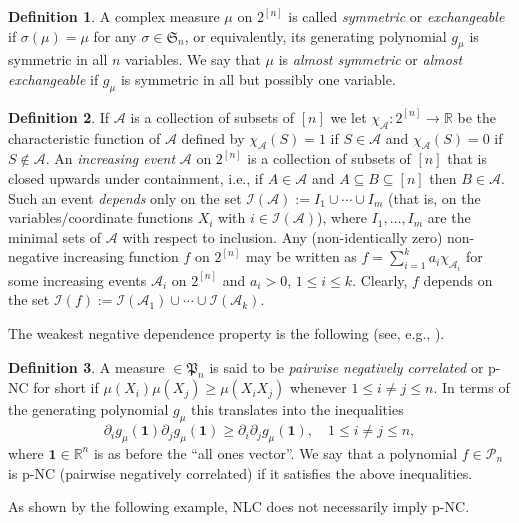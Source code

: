 \documentclass[10pt,reqno]{amsart}
\theoremstyle{plain}
\theoremstyle{definition}
\newtheorem{definition}{Definition}[section]
\theoremstyle{remark}
\newcommand{\PP}{\mathcal{P}}
\newcommand{\cI}{\mathcal{I}}
\newcommand{\cA}{\mathcal{A}}
\newcommand{\RR}{\mathbb{R}}
\newcommand{\ben}{\mathbf{1}}
\newcommand{\fP}{\mathfrak{P}}
\newcommand{\pa}{\partial}
\begin{document}
\begin{definition}\label{d-exc}
A complex measure $\mu$ on $2^{[n]}$ is called {\em symmetric} or
{\em exchangeable} if $\sigma(\mu)=\mu$ for any $\sigma\in \mathfrak{S}_n$,
or equivalently, its generating polynomial $g_\mu$ is symmetric in all $n$
variables. We say that $\mu$ is {\em almost symmetric} or {\em almost
exchangeable} if $g_\mu$ is symmetric in all but possibly one variable. 
\end{definition}

\begin{definition}\label{d-inc-ev}
If $\mathcal{A}$ is a collection of subsets of $[n]$ we let 
$\chi_{\mathcal{A}} : 2^{[n]} \rightarrow \RR$ be the characteristic function 
of $\mathcal{A}$ defined by 
$\chi_{\mathcal{A}}(S) = 1$ if $S \in \mathcal{A}$ and 
$\chi_{\mathcal{A}}(S) = 0$ if $S \notin \mathcal{A}$.
An {\em increasing event} $\mathcal{A}$ on $2^{[n]}$ is a collection of 
subsets of $[n]$ that is closed upwards under containment, i.e., if 
$A \in \mathcal{A}$ and $A \subseteq B \subseteq [n]$ then 
$B \in \mathcal{A}$. Such an event {\em depends} only on the set
$\cI(\cA):=I_1\cup\cdots\cup I_m$ (that is, on the variables/coordinate 
functions $X_i$ with 
$i\in\cI(\cA)$), where $I_1,\ldots,I_m$ are the minimal sets of $\cA$ 
with respect to inclusion. Any (non-identically zero) non-negative increasing
function $f$ on $2^{[n]}$ may be written as $f=\sum_{i=1}^{k}a_i\chi_{\cA_i}$ 
for some increasing events $\cA_i$ on $2^{[n]}$ and $a_i>0$, $1\le i\le k$.
Clearly, $f$ depends on the set $\cI(f):=\cI(\cA_1)\cup\cdots\cup\cI(\cA_k)$.
\end{definition}

The weakest negative dependence property is the following 
(see, e.g., \cite{P}).

\begin{definition}\label{d-pnc}
A measure $\in\fP_n$ is said to be {\em pairwise
negatively correlated} or p-NC for short 
if $\mu(X_i)\mu(X_j)\ge \mu(X_iX_j)$ whenever 
$1\le i\neq j\le n$. In terms of the generating polynomial $g_\mu$ this 
translates into the inequalities
$$\pa_i g_\mu(\ben)\pa_j g_\mu(\ben)\ge \pa_i \pa_j g_\mu(\ben),
\quad 1\le i\neq j\le n,$$
where $\ben\in\RR^n$ is as before the ``all ones vector''. We say
that a polynomial $f\in\PP_n$ is p-NC (pairwise negatively correlated) if it
satisfies the above inequalities. 
\end{definition}

As shown by the following example, NLC does not necessarily imply p-NC.
\end{document}

